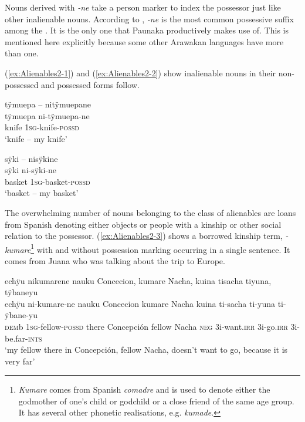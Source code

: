 Nouns derived with \textit{-ne} take a person marker to index the possessor just like other inalienable nouns. According to \citet[378]{Payne1991}, \textit{-ne} is the most common possessive suffix among the . It is the only one that Paunaka productively makes use of. This is mentioned here explicitly because some other Arawakan languages have more than one.

(\ref{ex:Alienables2-1}) and (\ref{ex:Alienables2-2}) show inalienable nouns in their non-possessed and possessed forms follow.%

\ea\label{ex:Alienables2-1}
\begingl 
\glpreamble tÿmuepa – nitÿmuepane\\
\gla tÿmuepa ni-tÿmuepa-ne\\ 
\glb knife 1\textsc{sg}-knife-\textsc{possd}\\ 
\glft ‘knife – my knife’
\endgl
\xe

\ea\label{ex:Alienables2-2}
\begingl 
\glpreamble sÿki – nisÿkine\\
\gla sÿki ni-sÿki-ne\\ 
\glb basket 1\textsc{sg}-basket-\textsc{possd}\\ 
\glft ‘basket – my basket’
\xe


The overwhelming number of nouns belonging to the class of alienables are loans from Spanish denoting either objects or people with a kinship or other social relation to the possessor. (\ref{ex:Alienables2-3}) shows a borrowed kinship term, \textit{-kumare}\footnote{\textit{Kumare} comes from Spanish \textit{comadre} and is used to denote either the godmother of one’s child or godchild or a close friend of the same age group. It has several other phonetic realisations, e.g. \textit{kumade}.} with and without possession marking occurring in a single sentence. It comes from Juana who was talking about the trip to Europe.

\ea\label{ex:Alienables2-3}
\begingl 
\glpreamble echÿu nikumarene nauku Concecion, kumare Nacha, kuina tisacha tiyuna, tÿbaneyu\\
\gla echÿu ni-kumare-ne nauku Concecion kumare Nacha kuina ti-sacha ti-yuna ti-ÿbane-yu\\ 
\glb \textsc{dem}b 1\textsc{sg}-fellow-\textsc{possd} there Concepción fellow Nacha \textsc{neg} 3i-want.\textsc{irr} 3i-go.\textsc{irr} 3i-be.far-\textsc{ints}\\ 
\glft ‘my fellow there in Concepción, fellow Nacha, doesn’t want to go, because it is very far’
\trailingcitation{[jxx-p120430l-1.175]}
\xe

